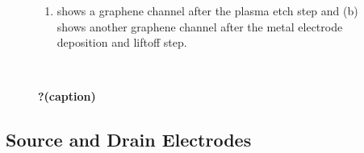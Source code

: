 \documentclass[
  a4paper,
]{scrbook}
\providecommand{\tightlist}{%
  \setlength{\itemsep}{0pt}\setlength{\parskip}{0pt}}\usepackage{longtable,booktabs,array}
\begin{document}
\begin{figure}
\begin{minipage}[t]{0.47\linewidth}
{{}

}

\subcaption{\label{fig-graphene-channel-electrodes}}
\end{minipage}%
\newline
\begin{minipage}[t]{0.47\linewidth}

{\centering 

\begin{enumerate}
\def\labelenumi{(\alph{enumi})}
\tightlist
\item
  shows a graphene channel after the plasma etch step and (b) shows
  another graphene channel after the metal electrode deposition and
  liftoff step.
\end{enumerate}

}

\end{minipage}%
%
\begin{minipage}[t]{0.05\linewidth}

{\centering 

~

}

\end{minipage}%

\caption{\label{fig-microscope-graphene-channel}\textbf{?(caption)}}

\end{figure}

\hypertarget{sec-electrodes}{%
\subsection{Source and Drain Electrodes}\label{sec-electrodes}}
\end{document}
